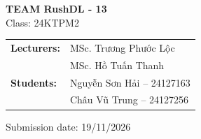 \begin{titlepage}
\begin{center}
  \vspace{0.5cm}
  {\Large\bfseries TEAM RushDL - 13}\\[0.2cm]
  {\large Class: 24KTPM2}

  \vspace{0.6cm}
  \begin{tabular}{@{}L{3.2cm}L{8cm}@{}}
    \textbf{Lecturers:} & MSc. Trương Phước Lộc\\
                        & MSc. Hồ Tuấn Thanh\\[0.3cm]
    \textbf{Students:}  & Nguyễn Sơn Hải -- 24127163\\
                        & Châu Vũ Trung -- 24127256
  \end{tabular}

  \vfill
  Submission date: 19/11/2026
  \vspace{0.5cm}
\end{center}
\end{titlepage}
